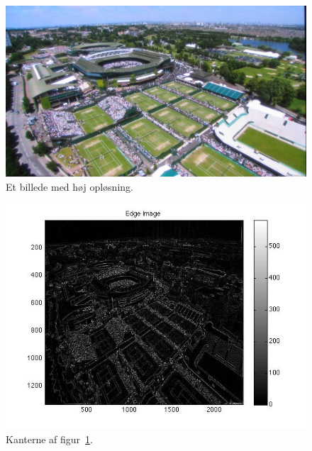\documentclass{article}
\begin{document}
	\begin{figure}
		\centering
		\includegraphics[width=4.5in]{test4.jpg}
		\caption{Et billede med høj opløsning.}
		\label{ke4}
	\end{figure}
	\begin{figure}
		\centering
		\includegraphics[width=6in]{test4_result.jpg}
		\caption{Kanterne af figur~\ref{ke4}.}
		\label{ke4r}
	\end{figure}
\end{document}
